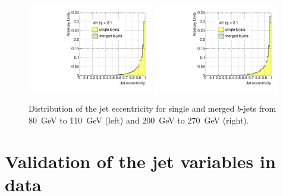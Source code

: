 
\begin{figure}[tp]
\centering
\includegraphics[width=0.49\textwidth]{FIGS/VarsSingleMerged/JetEcc080.pdf}
\includegraphics[width=0.49\textwidth]{FIGS/VarsSingleMerged/JetEcc200.pdf}
\caption{Distribution of the jet eccentricity for single and merged $b$-jets from 80~GeV to 110~GeV (left) and 200~GeV to 270~GeV (right).}
\label{fig:jeteccsinglemerged}
\end{figure}








\section{Validation of the jet variables in data}\label{sec:gbbValidation}

